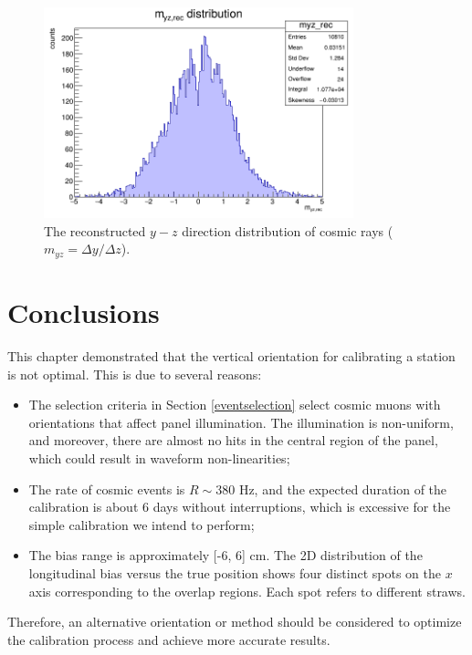 \begin{figure}[!h]
    \centering
    \includegraphics[width=0.8\textwidth]{figures/png/myz_rec.png}
    \caption[The reconstructed $y-z$ direction distribution of cosmic rays.]{The reconstructed $y-z$ direction distribution of cosmic rays ($m_{yz}=\Delta y /\Delta z$).}
    \label{fig:myzrec}
\end{figure}
\section{Conclusions}
This chapter demonstrated that the vertical orientation for calibrating a station is not optimal. This is due to several reasons:
\begin{itemize}
    \item The selection criteria in Section \ref{eventselection} select cosmic muons with orientations that affect panel illumination. 
    The illumination is non-uniform, and moreover, there are almost no hits in the central region of the panel, which could result in waveform non-linearities;
    \item The rate of cosmic events is $R \sim 380$ Hz, and the expected duration of the calibration is about 6 days without interruptions, 
    which is excessive for the simple calibration we intend to perform;
    \item The bias range is approximately [-6, 6] cm. The 2D distribution of the longitudinal bias versus the true position shows 
    four distinct spots on the $x$ axis corresponding to the overlap regions. Each spot refers to different straws.
\end{itemize}
Therefore, an alternative orientation or method should be considered to optimize the calibration process and achieve more accurate results.







